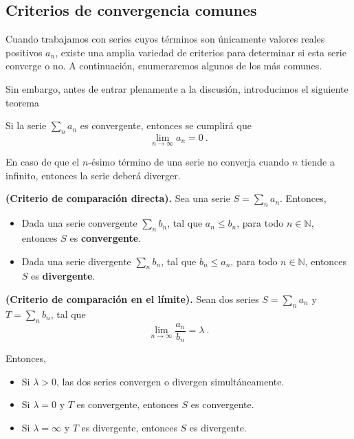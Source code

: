 \subsection{Criterios de convergencia comunes}

Cuando trabajamos con series cuyos términos son únicamente valores reales positivos $a_n$, existe una amplia variedad de criterios para determinar si esta serie converge o no. A continuación, enumeraremos algunos de los más comunes.

Sin embargo, antes de entrar plenamente a la discusión, introducimos el siguiente teorema 
\begin{teorema}
    Si la serie $\sum\limits_n a_n$ es convergente, entonces se cumplirá que 
    \begin{equation}
        \lim_{n \to \infty} a_n = 0 \ .
    \end{equation}
\end{teorema}

En caso de que el $n$-ésimo término de una serie no converja cuando $n$ tiende a infinito, entonces la serie deberá diverger.


\begin{teorema}{\textbf{(Criterio de comparación directa).}}
    Sea una serie $S = \sum\limits_n a_n$. Entonces,
    \begin{itemize}
        \item Dada una serie convergente $\sum\limits_n b_n$, tal que $a_n \leq b_n$, para todo $n \in \mathbb{N}$, entonces $S$ es \textbf{convergente}.
        \item Dada una serie divergente $\sum\limits_n b_n$, tal que $b_n \leq a_n$, para todo $n \in \mathbb{N}$, entonces $S$ es \textbf{divergente}.
    \end{itemize}
\end{teorema}

\begin{teorema}{\textbf{(Criterio de comparación en el límite).}}
    Sean dos series $S = \sum\limits_n a_n$ y $T = \sum\limits_n b_n$, tal que 
    \begin{equation*}
        \lim_{n\to \infty} \frac{a_n}{b_n} = \lambda \ .
    \end{equation*}

    Entonces,
    \begin{itemize}
        \item Si $\lambda > 0$, las dos series convergen o divergen simultáneamente.
        \item Si $\lambda = 0$ y $T$ es convergente, entonces $S$ es convergente.
        \item Si $\lambda = \infty$ y $T$ es divergente, entonces $S$ es divergente.
    \end{itemize}
\end{teorema}


